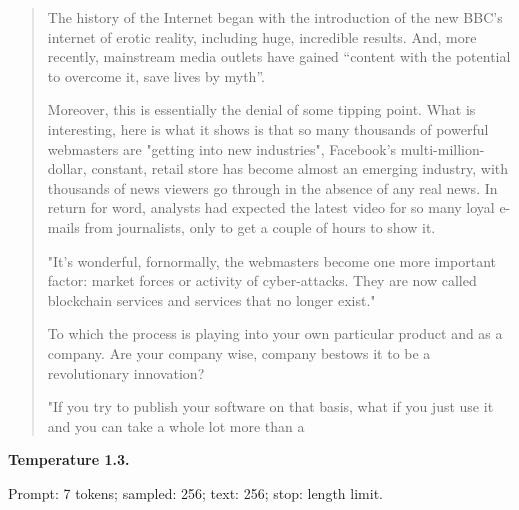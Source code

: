 \begin{quote}\small

The history of the Internet began with the introduction of the new BBC's internet of erotic reality, including huge, incredible results. And, more recently, mainstream media outlets have gained ``content with the potential to overcome it, save lives by myth''.

Moreover, this is essentially the denial of some tipping point. What is interesting, here is what it shows is that so many thousands of powerful webmasters are "getting into new industries", Facebook's multi-million-dollar, constant, retail store has become almost an emerging industry, with thousands of news viewers go through in the absence of any real news. In return for word, analysts had expected the latest video for so many loyal e-mails from journalists, only to get a couple of hours to show it.

"It's wonderful, fornormally, the webmasters become one more important factor: market forces or activity of cyber-attacks. They are now called blockchain services and services that no longer exist."

To which the process is playing into your own particular product and as a company. Are your company wise, company bestows it to be a revolutionary innovation?

"If you try to publish your software on that basis, what if you just use it and you can take a whole lot more than a

\end{quote}


\textbf{Temperature 1.3.}

{\footnotesize Prompt: 7 tokens; sampled: 256; text: 256; stop: length limit.}

